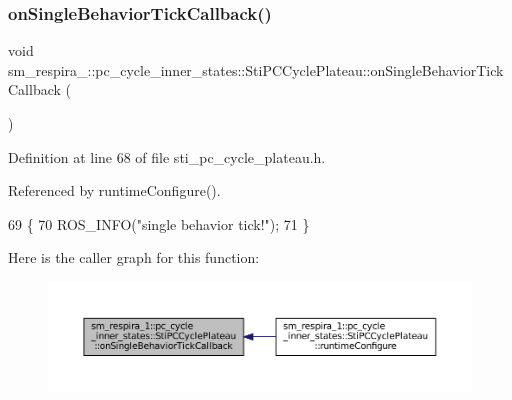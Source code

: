\subsubsection{\texorpdfstring{on\+Single\+Behavior\+Tick\+Callback()}{onSingleBehaviorTickCallback()}}
{\footnotesize\ttfamily void sm\+\_\+respira\+\_\+::pc\+\_\+cycle\+\_\+inner\+\_\+states\+::\+Sti\+P\+C\+Cycle\+Plateau\+::on\+Single\+Behavior\+Tick\+Callback (\begin{DoxyParamCaption}{ }\end{DoxyParamCaption})\hspace{0.3cm}{\ttfamily [inline]}}



Definition at line 68 of file sti\+\_\+pc\+\_\+cycle\+\_\+plateau.\+h.



Referenced by runtime\+Configure().


\begin{DoxyCode}
69   \{
70     ROS\_INFO(\textcolor{stringliteral}{"single behavior tick!"});
71   \}
\end{DoxyCode}
Here is the caller graph for this function\+:
\nopagebreak
\begin{figure}[H]
\begin{center}
\leavevmode
\includegraphics[width=350pt]{structsm__respira__1_1_1pc__cycle__inner__states_1_1StiPCCyclePlateau_ac60bee4ecb4dd1983446b091075ce0b3_icgraph}
\end{center}
\end{figure}
\mbox{\label{structsm__respira__1_1_1pc__cycle__inner__states_1_1StiPCCyclePlateau_ac06330f07324f60ea5870ac89c75f7c5}} 
